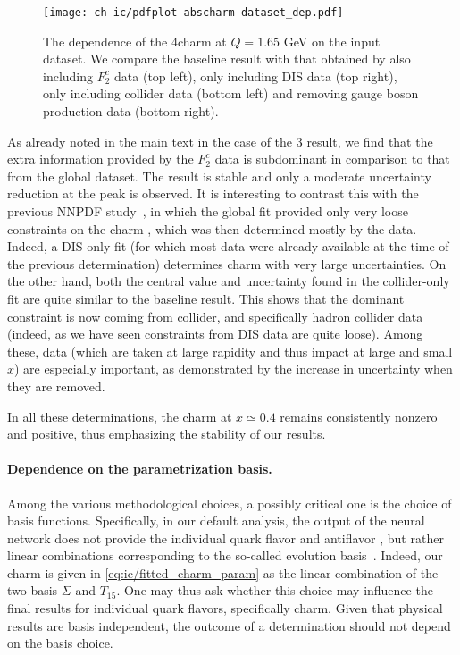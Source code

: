 \begin{figure}[t!]
  \begin{center}
    \texttt{[image: ch-ic/pdfplot-abscharm-dataset\_dep.pdf]}
    \caption{\small The dependence of the 4\fns charm \pdf at $Q=1.65$ GeV on
      the input dataset.
      We compare the
    baseline result with that obtained by also including 
      \emc $F_2^c$ data (top left), only including DIS data (top
    right), only including collider data (bottom left) and removing
    \lhcb gauge boson production data (bottom right). 
  \label{fig:ic/charm_dataset_dep} }
\end{center}
\end{figure}

As already noted in the main  text in the case of the 3\fns
result, we find that the extra information provided by the  \emc
$F_2^c$ data is subdominant in comparison to that from the global
dataset. The result is stable and only a moderate
uncertainty reduction at the peak is observed. It is interesting to
contrast this with the previous NNPDF study~\cite{Ball:2016neh}, in
which the global fit provided only very loose constraints on the charm
\pdf, which was then determined mostly by the \emc data.
%
Indeed, a DIS-only fit (for which most data were already available at the time
of the previous determination) determines charm with very large
uncertainties. On the other hand, both the central value and
uncertainty found in the collider-only fit are quite similar to the
baseline result.
%
This shows that the dominant constraint is now coming from
collider, and specifically hadron collider data (indeed, as we have
seen constraints from DIS data are quite loose). Among these, \lhcb
data (which are taken at large rapidity and thus impact \pdfs at large
and small $x$) are especially important, as demonstrated by the
increase in uncertainty when they are removed.

In all these determinations, the charm
\pdf at $x\simeq 0.4$ remains consistently nonzero and positive, thus
emphasizing the stability of our results.

\paragraph{Dependence on the parametrization basis.}
%
Among the various methodological choices, a possibly critical one is
the choice of basis functions. Specifically, in our default analysis,
the output of the neural network does not provide the individual
quark flavor and antiflavor \pdfs, but rather linear combinations
corresponding to the so-called evolution
basis~\cite{Ball:2021leu}. Indeed, our charm \pdf is given in
\cref{eq:ic/fitted_charm_param}  as the linear combination of the
two basis \pdfs $\Sigma$ and $T_{15}$.
One may thus ask whether this choice may influence the final results
for individual quark flavors, specifically charm.
Given that physical results are basis
independent, the outcome of a \pdf determination should not depend
on the basis choice.

